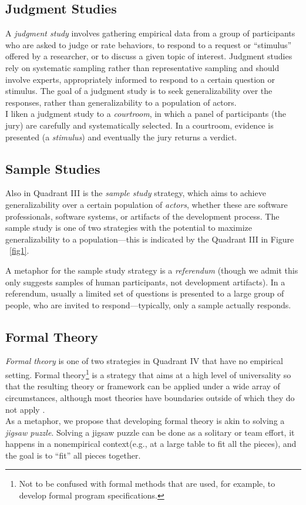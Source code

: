 \documentclass[runningheads]{llncs}
\begin{document}
\subsection{Judgment Studies}
A \emph{judgment study} involves gathering empirical data from a group of participants who are asked to judge or rate behaviors, to respond to a request or “stimulus” offered by a researcher, or to discuss a given topic of interest. Judgment studies rely on systematic sampling rather than representative sampling and should involve experts, appropriately informed to respond to a certain question or stimulus. The goal of a judgment study is to seek generalizability over the responses, rather than generalizability to a population of actors.
\\
I liken a judgment study to a \emph{courtroom}, in which a panel of participants (the jury) are carefully and systematically selected. In a courtroom, evidence is presented (a \emph{stimulus}) and eventually the jury returns a verdict.

\subsection{Sample Studies}
Also in Quadrant III is the \emph{sample study} strategy, which aims to achieve generalizability over a certain population of \emph{actors}, whether these are software professionals, software systems, or artifacts of the development process. The sample study is one of two strategies with the potential to maximize generalizability to a population—this is indicated by the Quadrant III in Figure ~\ref{fig1}.

A metaphor for the sample study strategy is a \emph{referendum} (though we admit this only suggests samples of human participants, not development artifacts). In a referendum, usually a limited set of questions is presented to a large group of people, who are invited to respond—typically, only a sample actually responds.

\subsection{Formal Theory}
\emph{Formal theory} is one of two strategies in Quadrant IV that have no empirical setting. Formal theory\footnote{Not to be confused with formal methods that are used, for example, to develop formal program specifications.} is a strategy that aims at a high level of universality so that the resulting theory or framework can be applied under a wide array of circumstances, although most theories have boundaries outside of which they do not apply \cite{ref_article7}.
\\
As a metaphor, we propose that developing formal theory is akin to solving a \emph{jigsaw puzzle}. Solving a jigsaw puzzle can be done as a solitary or team effort, it happens in a nonempirical context(e.g., at a large table to fit all the pieces), and the goal is to “fit” all pieces together.
\end{document}
